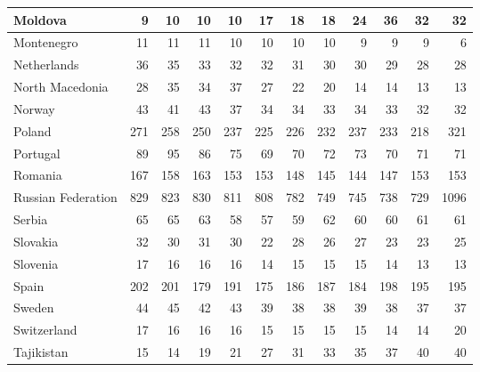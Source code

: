 \begin{table}
\begin{tabular}{|l|r|r|r|r|r|r|r|r|r|r|r|}
                       Moldova&      9&     10&     10&     10&     17&     18&     18&     24&     36&     32&     32\\\hline
                    Montenegro&     11&     11&     11&     10&     10&     10&     10&      9&      9&      9&      6\\\hline
                   Netherlands&     36&     35&     33&     32&     32&     31&     30&     30&     29&     28&     28\\\hline
               North Macedonia&     28&     35&     34&     37&     27&     22&     20&     14&     14&     13&     13\\\hline
                        Norway&     43&     41&     43&     37&     34&     34&     33&     34&     33&     32&     32\\\hline
                        Poland&    271&    258&    250&    237&    225&    226&    232&    237&    233&    218&    321\\\hline
                      Portugal&     89&     95&     86&     75&     69&     70&     72&     73&     70&     71&     71\\\hline
                       Romania&    167&    158&    163&    153&    153&    148&    145&    144&    147&    153&    153\\\hline
            Russian Federation&    829&    823&    830&    811&    808&    782&    749&    745&    738&    729&   1096\\\hline
                        Serbia&     65&     65&     63&     58&     57&     59&     62&     60&     60&     61&     61\\\hline
                      Slovakia&     32&     30&     31&     30&     22&     28&     26&     27&     23&     23&     25\\\hline
                      Slovenia&     17&     16&     16&     16&     14&     15&     15&     15&     14&     13&     13\\\hline
                         Spain&    202&    201&    179&    191&    175&    186&    187&    184&    198&    195&    195\\\hline
                        Sweden&     44&     45&     42&     43&     39&     38&     38&     39&     38&     37&     37\\\hline
                   Switzerland&     17&     16&     16&     16&     15&     15&     15&     15&     14&     14&     20\\\hline
                    Tajikistan&     15&     14&     19&     21&     27&     31&     33&     35&     37&     40&     40\\\hline

\end{tabular}
\end{table}
